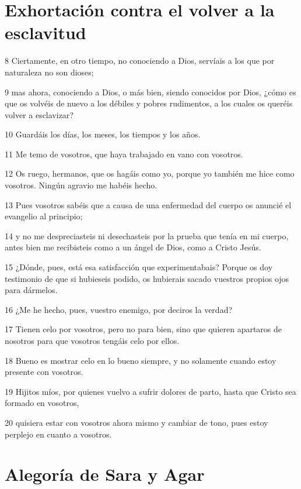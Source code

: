 \section*{Exhortación contra el volver a la esclavitud}

\par 8 Ciertamente, en otro tiempo, no conociendo a Dios, servíais a los que por naturaleza no son dioses;
\par 9 mas ahora, conociendo a Dios, o más bien, siendo conocidos por Dios, ¿cómo es que os volvéis de nuevo a los débiles y pobres rudimentos, a los cuales os queréis volver a esclavizar?
\par 10 Guardáis los días, los meses, los tiempos y los años.
\par 11 Me temo de vosotros, que haya trabajado en vano con vosotros.
\par 12 Os ruego, hermanos, que os hagáis como yo, porque yo también me hice como vosotros. Ningún agravio me habéis hecho.
\par 13 Pues vosotros sabéis que a causa de una enfermedad del cuerpo os anuncié el evangelio al principio;
\par 14 y no me despreciasteis ni desechasteis por la prueba que tenía en mi cuerpo, antes bien me recibisteis como a un ángel de Dios, como a Cristo Jesús.
\par 15 ¿Dónde, pues, está esa satisfacción que experimentabais? Porque os doy testimonio de que si hubieseis podido, os hubierais sacado vuestros propios ojos para dármelos.
\par 16 ¿Me he hecho, pues, vuestro enemigo, por deciros la verdad?
\par 17 Tienen celo por vosotros, pero no para bien, sino que quieren apartaros de nosotros para que vosotros tengáis celo por ellos.
\par 18 Bueno es mostrar celo en lo bueno siempre, y no solamente cuando estoy presente con vosotros.
\par 19 Hijitos míos, por quienes vuelvo a sufrir dolores de parto, hasta que Cristo sea formado en vosotros,
\par 20 quisiera estar con vosotros ahora mismo y cambiar de tono, pues estoy perplejo en cuanto a vosotros.

\section*{Alegoría de Sara y Agar}

